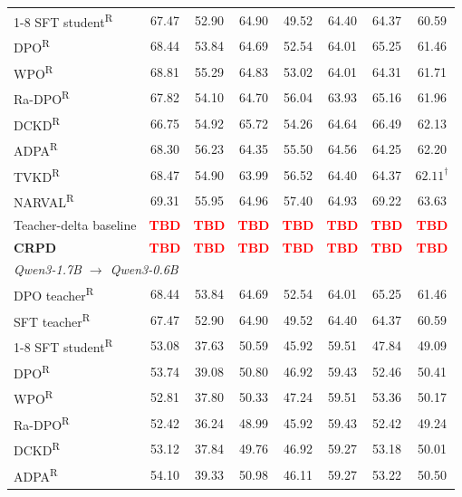 \documentclass[pdflatex,sn-mathphys-num,review]{sn-jnl}
\theoremstyle{thmstyleone}
\theoremstyle{thmstyletwo}
\theoremstyle{thmstylethree}
\providecommand{\muhat}{\widehat{\mu}}
\newcommand{\tbd}[1][]{\textcolor{red}{\textbf{TBD#1}}}
\begin{document}
\begin{table}[t]
{\begin{tabular}{lccccccc}
\cmidrule(lr){1-8}
SFT student\textsuperscript{R} & 67.47 & 52.90 & 64.90 & 49.52 & 64.40 & 64.37 & 60.59 \\
DPO\textsuperscript{R} & 68.44 & 53.84 & 64.69 & 52.54 & 64.01 & 65.25 & 61.46 \\
WPO\textsuperscript{R} & 68.81 & 55.29 & 64.83 & 53.02 & 64.01 & 64.31 & 61.71 \\
Ra-DPO\textsuperscript{R} & 67.82 & 54.10 & 64.70 & 56.04 & 63.93 & 65.16 & 61.96 \\
DCKD\textsuperscript{R} & 66.75 & 54.92 & 65.72 & 54.26 & 64.64 & 66.49 & 62.13 \\
ADPA\textsuperscript{R} & 68.30 & 56.23 & 64.35 & 55.50 & 64.56 & 64.25 & 62.20 \\
TVKD\textsuperscript{R} & 68.47 & 54.90 & 63.99 & 56.52 & 64.40 & 64.37 & $62.11^{\dagger}$ \\
NARVAL\textsuperscript{R} & 69.31 & 55.95 & 64.96 & 57.40 & 64.93 & 69.22 & 63.63 \\
Teacher-delta baseline & \tbd & \tbd & \tbd & \tbd & \tbd & \tbd & \tbd \\
\rowcolor{gray!20}
\textbf{CRPD} & \tbd & \tbd & \tbd & \tbd & \tbd & \tbd & \tbd \\
\midrule
\multicolumn{8}{l}{\textit{Qwen3-1.7B $\to$ Qwen3-0.6B}} \\
\midrule
DPO teacher\textsuperscript{R} & 68.44 & 53.84 & 64.69 & 52.54 & 64.01 & 65.25 & 61.46 \\
SFT teacher\textsuperscript{R} & 67.47 & 52.90 & 64.90 & 49.52 & 64.40 & 64.37 & 60.59 \\
\cmidrule(lr){1-8}
SFT student\textsuperscript{R} & 53.08 & 37.63 & 50.59 & 45.92 & 59.51 & 47.84 & 49.09 \\
DPO\textsuperscript{R} & 53.74 & 39.08 & 50.80 & 46.92 & 59.43 & 52.46 & 50.41 \\
WPO\textsuperscript{R} & 52.81 & 37.80 & 50.33 & 47.24 & 59.51 & 53.36 & 50.17 \\
Ra-DPO\textsuperscript{R} & 52.42 & 36.24 & 48.99 & 45.92 & 59.43 & 52.42 & 49.24 \\
DCKD\textsuperscript{R} & 53.12 & 37.84 & 49.76 & 46.92 & 59.27 & 53.18 & 50.01 \\
ADPA\textsuperscript{R} & 54.10 & 39.33 & 50.98 & 46.11 & 59.27 & 53.22 & 50.50 \\

\end{tabular}}
\end{table}
\end{document}
